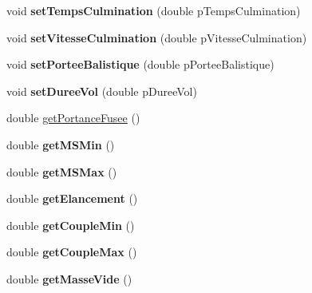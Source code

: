 \begin{DoxyCompactItemize}
void {\bfseries set\+Temps\+Culmination} (double p\+Temps\+Culmination)
\item 
\mbox{\label{classpackage_i_h_m_1_1_fusee_a7101d60099df5944d5967c1a9ae0a4fd}} 
void {\bfseries set\+Vitesse\+Culmination} (double p\+Vitesse\+Culmination)
\item 
\mbox{\label{classpackage_i_h_m_1_1_fusee_a83206f19aecc7c04f17b7cba17572473}} 
void {\bfseries set\+Portee\+Balistique} (double p\+Portee\+Balistique)
\item 
\mbox{\label{classpackage_i_h_m_1_1_fusee_ad93195b0678feb43125f3f2c537f4f69}} 
void {\bfseries set\+Duree\+Vol} (double p\+Duree\+Vol)
\item 
double \mbox{\hyperlink{classpackage_i_h_m_1_1_fusee_afc0492c0c663001bd7a0369842e988ba}{get\+Portance\+Fusee}} ()
\item 
\mbox{\label{classpackage_i_h_m_1_1_fusee_a91878f710e3a177f75f242c2e8a0a129}} 
double {\bfseries get\+M\+S\+Min} ()
\item 
\mbox{\label{classpackage_i_h_m_1_1_fusee_ac4f58a623e42fa4674dcc3b96c4eecc0}} 
double {\bfseries get\+M\+S\+Max} ()
\item 
\mbox{\label{classpackage_i_h_m_1_1_fusee_aae742d9537e9f3f6d72047927221b7cf}} 
double {\bfseries get\+Elancement} ()
\item 
\mbox{\label{classpackage_i_h_m_1_1_fusee_aa6f38f4cd95f564098a2f07535153e2e}} 
double {\bfseries get\+Couple\+Min} ()
\item 
\mbox{\label{classpackage_i_h_m_1_1_fusee_a74a6a156b46d1fc48871201d4de59b00}} 
double {\bfseries get\+Couple\+Max} ()
\item 
\mbox{\label{classpackage_i_h_m_1_1_fusee_ad951fb65e362de81a51886a313b5eccb}} 
double {\bfseries get\+Masse\+Vide} ()
\item 
\mbox{\label{classpackage_i_h_m_1_1_fusee_a0ff2feb9e773be035788c1ad77bcb4b9}} 

\end{DoxyCompactItemize}
